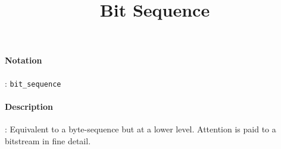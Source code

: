 \documentclass[10pt,a4paper,oneside]{scrartcl}
\author{}
\title{Bit Sequence}
\date{}
\begin{document}
\maketitle
\paragraph{Notation}: \texttt{bit\_sequence}
\paragraph{Description}: Equivalent to a byte-sequence but at a lower level. Attention is paid to a bitstream in fine detail.
\end{document}
